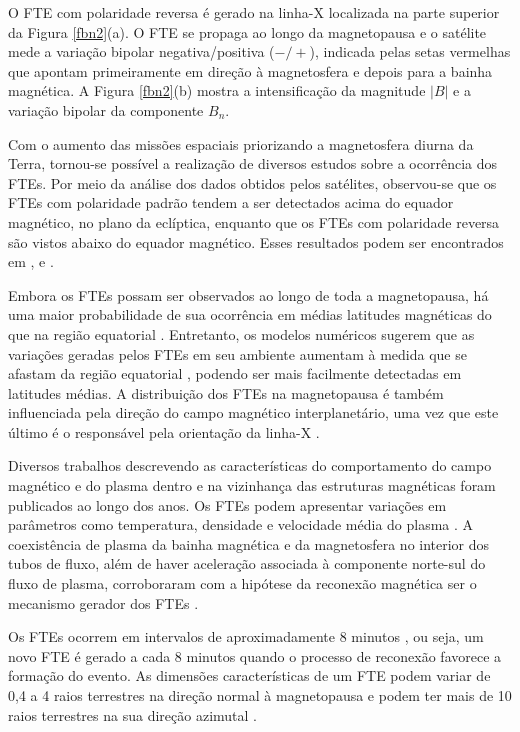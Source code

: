 O FTE com polaridade reversa é gerado na linha-X localizada na parte superior da Figura \ref{fbn2}(a). O FTE se propaga ao longo da magnetopausa e o satélite mede a variação
bipolar negativa/positiva ($-/+$), indicada pelas setas vermelhas que apontam primeiramente em direção à magnetosfera e depois para a bainha magnética. A Figura \ref{fbn2}(b) mostra a intensificação da magnitude $\left|B\right|$ e a variação bipolar da componente $B_{n}$.

Com o aumento das missões espaciais priorizando a magnetosfera diurna da Terra, tornou-se possível a realização de diversos estudos sobre a ocorrência dos FTEs. Por meio da análise dos dados obtidos pelos satélites, observou-se que os FTEs com polaridade padrão tendem a ser detectados acima do equador magnético, no plano da eclíptica, enquanto que os FTEs com polaridade reversa são vistos abaixo do equador magnético. Esses resultados podem ser encontrados em \cite{BerchemandRussell1984}, \cite{Rijnbeeketal1984} e \cite{Russelletal1996}. 

Embora os FTEs possam ser observados ao longo de toda a magnetopausa, há uma maior probabilidade de sua ocorrência em médias latitudes magnéticas do que na região equatorial \cite{BerchemandRussell1984}. Entretanto, os modelos numéricos sugerem que as variações geradas pelos FTEs em seu ambiente aumentam à medida que se afastam da região equatorial \cite{SibeckandLin2010}, podendo ser mais facilmente detectadas em latitudes médias. A distribuição dos FTEs na magnetopausa é também influenciada pela direção do campo magnético interplanetário, uma vez que este último é o responsável pela orientação da linha-X \cite{Russelletal1985,Fearetal2009,Silveira2015}.

Diversos trabalhos descrevendo as características do comportamento do campo magnético e do plasma dentro e na vizinhança das estruturas magnéticas foram publicados ao longo dos anos. Os FTEs podem apresentar variações em parâmetros como temperatura, densidade e velocidade média do plasma \cite{Elphic1995,Paschmannetal1982}.  A coexistência de plasma da bainha magnética e da magnetosfera no interior dos tubos de fluxo, além de haver aceleração associada à componente norte-sul do fluxo de plasma, corroboraram com a hipótese da reconexão magnética ser o mecanismo gerador dos FTEs \cite{Paschmannetal1982}. 

Os FTEs ocorrem em intervalos de aproximadamente 8 minutos \cite{Rijnbeeketal1984}, ou seja, um novo FTE é gerado a cada 8 minutos quando o processo de reconexão favorece a formação do evento. As dimensões características de um FTE podem variar de 0,4 a 4 raios terrestres na direção normal à magnetopausa \cite{Owenetal2001} e podem ter mais de 10 raios terrestres na sua direção azimutal \cite{Fearetal2008}.

